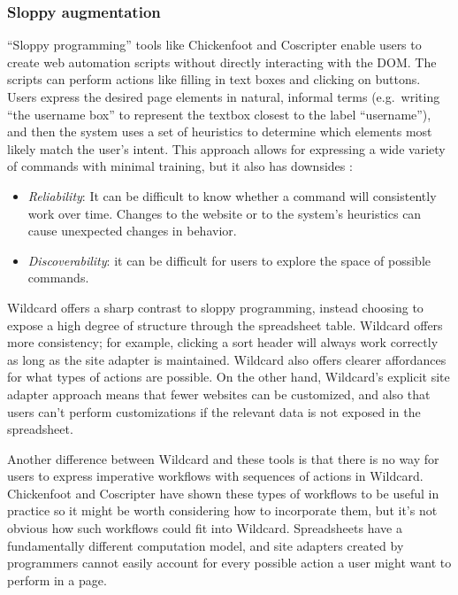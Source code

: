 \documentclass[english]{programming}
\providecommand{\tightlist}{%
  \setlength{\itemsep}{0pt}\setlength{\parskip}{0pt}}
\begin{document}
\hypertarget{sloppy-augmentation}{%
\subsubsection{Sloppy augmentation}\label{sloppy-augmentation}}

``Sloppy programming'' \autocite{little2010} tools like Chickenfoot
\autocite{bolin2005} and Coscripter \autocite{leshed2008} enable users
to create web automation scripts without directly interacting with the
DOM. The scripts can perform actions like filling in text boxes and
clicking on buttons. Users express the desired page elements in natural,
informal terms (e.g.~writing ``the username box'' to represent the
textbox closest to the label ``username''), and then the system uses a
set of heuristics to determine which elements most likely match the
user's intent. This approach allows for expressing a wide variety of
commands with minimal training, but it also has downsides
\autocite{little2010}:

\begin{itemize}
\tightlist
\item
  \emph{Reliability}: It can be difficult to know whether a command will
  consistently work over time. Changes to the website or to the system's
  heuristics can cause unexpected changes in behavior.
\item
  \emph{Discoverability}: it can be difficult for users to explore the
  space of possible commands.
\end{itemize}

Wildcard offers a sharp contrast to sloppy programming, instead choosing
to expose a high degree of structure through the spreadsheet table.
Wildcard offers more consistency; for example, clicking a sort header
will always work correctly as long as the site adapter is maintained.
Wildcard also offers clearer affordances for what types of actions are
possible. On the other hand, Wildcard's explicit site adapter approach
means that fewer websites can be customized, and also that users can't
perform customizations if the relevant data is not exposed in the
spreadsheet.

Another difference between Wildcard and these tools is that there is no
way for users to express imperative workflows with sequences of actions
in Wildcard. Chickenfoot and Coscripter have shown these types of
workflows to be useful in practice so it might be worth considering how
to incorporate them, but it's not obvious how such workflows could fit
into Wildcard. Spreadsheets have a fundamentally different computation
model, and site adapters created by programmers cannot easily account
for every possible action a user might want to perform in a page.
\end{document}
